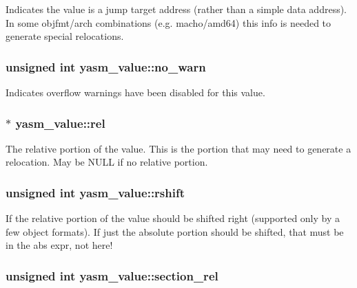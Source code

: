 Indicates the value is a jump target address (rather than a simple data address). In some objfmt/arch combinations (e.\-g. macho/amd64) this info is needed to generate special relocations. \hypertarget{structyasm__value_a9eb5b938e2e9aad4ce846b3dc4cfd5e6}{
\subsubsection[{no\-\_\-warn}]{\setlength{\rightskip}{0pt plus 5cm}unsigned int yasm\-\_\-value\-::no\-\_\-warn}}\label{structyasm__value_a9eb5b938e2e9aad4ce846b3dc4cfd5e6}
Indicates overflow warnings have been disabled for this value. \hypertarget{structyasm__value_a5eba66589ecf8902279a9f865f1624da}{
\subsubsection[{rel}]{$\ast$ yasm\-\_\-value\-::rel}}\label{structyasm__value_a5eba66589ecf8902279a9f865f1624da}
The relative portion of the value. This is the portion that may need to generate a relocation. May be N\-U\-L\-L if no relative portion. \hypertarget{structyasm__value_a475cbc7240df61e11ac2e5da267d2153}{
\subsubsection[{rshift}]{\setlength{\rightskip}{0pt plus 5cm}unsigned int yasm\-\_\-value\-::rshift}}\label{structyasm__value_a475cbc7240df61e11ac2e5da267d2153}
If the relative portion of the value should be shifted right (supported only by a few object formats). If just the absolute portion should be shifted, that must be in the abs expr, not here! \hypertarget{structyasm__value_ae906d78ee730dd2a0127d28228db65d9}{
\subsubsection[{section\-\_\-rel}]{\setlength{\rightskip}{0pt plus 5cm}unsigned int yasm\-\_\-value\-::section\-\_\-rel}}\label{structyasm__value_ae906d78ee730dd2a0127d28228db65d9}
